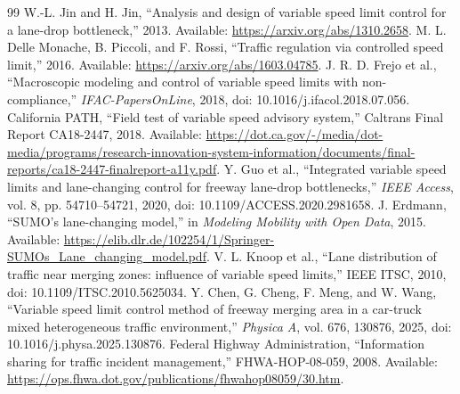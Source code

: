 \documentclass[10pt]{article}
\begin{document}
\small
\begin{thebibliography}{99}
 W.-L. Jin and H. Jin, ``Analysis and design of variable speed
limit control for a lane-drop bottleneck,'' 2013. Available:
\url{https://arxiv.org/abs/1310.2658}.
 M. L. Delle Monache, B. Piccoli, and F. Rossi,
``Traffic regulation via controlled speed limit,'' 2016. Available:
\url{https://arxiv.org/abs/1603.04785}.
 J. R. D. Frejo et al., ``Macroscopic modeling and control of
variable speed limits with non-compliance,'' \emph{IFAC-PapersOnLine}, 2018,
doi: 10.1016/j.ifacol.2018.07.056.
 California PATH, ``Field test of variable speed advisory
system,'' Caltrans Final Report CA18-2447, 2018. Available:
\url{https://dot.ca.gov/-/media/dot-media/programs/research-innovation-system-information/documents/final-reports/ca18-2447-finalreport-a11y.pdf}.
 Y. Guo et al., ``Integrated variable speed limits and
lane-changing control for freeway lane-drop bottlenecks,'' \emph{IEEE Access},
vol. 8, pp. 54710--54721, 2020, doi: 10.1109/ACCESS.2020.2981658.
 J. Erdmann, ``SUMO's lane-changing model,'' in
\emph{Modeling Mobility with Open Data}, 2015. Available:
\url{https://elib.dlr.de/102254/1/Springer-SUMOs_Lane_changing_model.pdf}.
 V. L. Knoop et al., ``Lane distribution of traffic near
merging zones: influence of variable speed limits,'' IEEE ITSC, 2010,
doi: 10.1109/ITSC.2010.5625034.
 Y. Chen, G. Cheng, F. Meng, and W. Wang, ``Variable speed
limit control method of freeway merging area in a car-truck mixed heterogeneous
traffic environment,'' \emph{Physica A}, vol. 676, 130876, 2025,
doi: 10.1016/j.physa.2025.130876.
 Federal Highway Administration, ``Information sharing for
traffic incident management,'' FHWA-HOP-08-059, 2008. Available:
\url{https://ops.fhwa.dot.gov/publications/fhwahop08059/30.htm}.
\end{thebibliography}
\end{document}
